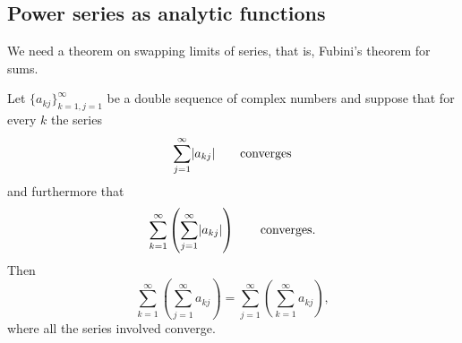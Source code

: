 \subsection{Power series as analytic functions}

We need a theorem on swapping limits of series, that is, 
Fubini's theorem for sums.

\begin{thm} \label{thm:fubiniforsums}
Let $\{ a_{kj} \}_{k=1,j=1}^\infty$ be a double
sequence of complex numbers and suppose that for every $k$ the series
\begin{equation*}
\sum_{j=1}^\infty \lvert {a_{kj}} \rvert \qquad \text{converges}
\end{equation*}
and furthermore that
\begin{equation*}
\sum_{k=1}^\infty \left( \sum_{j=1}^\infty \lvert {a_{kj}} \rvert \right)
\qquad \text{converges}.
\end{equation*}
Then
\begin{equation*}
\sum_{k=1}^\infty \left( \sum_{j=1}^\infty a_{kj} \right)
=
\sum_{j=1}^\infty \left( \sum_{k=1}^\infty a_{kj} \right) ,
\end{equation*}
where all the series involved converge.
\end{thm}

